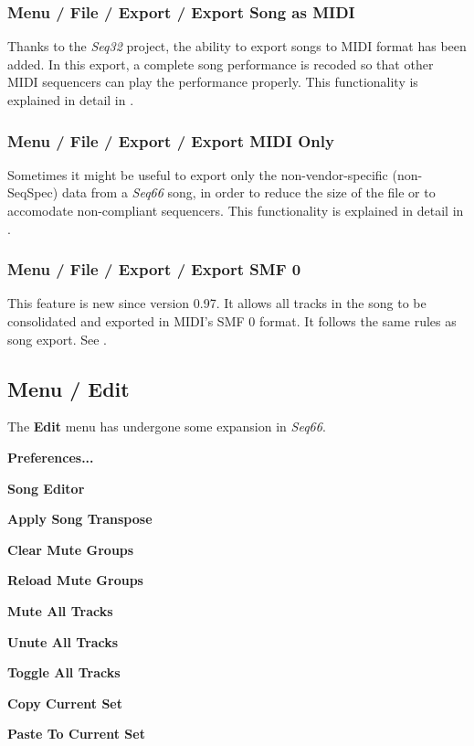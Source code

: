 \subsubsection{Menu / File / Export / Export Song as MIDI}
\label{subsubsec:menu_file_export}

   Thanks to the \textsl{Seq32} project, the ability to export songs to MIDI
   format has been added.  In this export, a complete song performance is
   recoded so that other MIDI sequencers can play the performance properly.
   This functionality is explained in detail in
   .

\subsubsection{Menu / File / Export / Export MIDI Only}
\label{subsubsec:menu_file_export_midi_only}

   Sometimes it might be useful to export only the non-vendor-specific
   (non-SeqSpec) data from a \textsl{Seq66} song, in order to reduce the
   size of the file or to accomodate non-compliant sequencers.
   This functionality is explained in detail in
   .

\subsubsection{Menu / File / Export / Export SMF 0}
\label{subsubsec:menu_file_export_smf_0}

   This feature is new since version 0.97.  It allows all tracks in the song to
   be consolidated and exported in MIDI's SMF 0 format.  It follows the same
   rules as song export.
   See .

\subsection{Menu / Edit}
\label{subsec:menu_edit}

   The \textbf{Edit} menu has undergone some expansion in \textsl{Seq66}.

   \begin{enumber}
      \item \textbf{Preferences...}
      \item \textbf{Song Editor}
      \item \textbf{Apply Song Transpose}
      \item \textbf{Clear Mute Groups}
      \item \textbf{Reload Mute Groups}
      \item \textbf{Mute All Tracks}
      \item \textbf{Unute All Tracks}
      \item \textbf{Toggle All Tracks}
      \item \textbf{Copy Current Set}
      \item \textbf{Paste To Current Set}
   \end{enumber}

